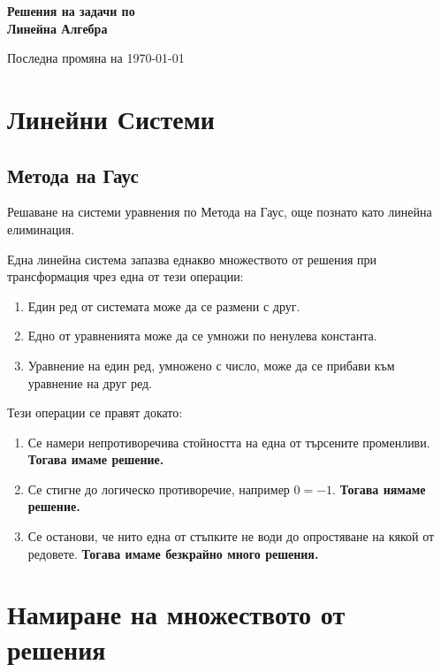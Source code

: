 \documentclass[12pt]{article}
\begin{document}
\begin{titlepage}
    \begin{center}
        \huge
        \textbf{Решения на задачи по \\ Линейна Алгебра}

        \large \vfill
        Последна промяна на \today
    \end{center}
\end{titlepage}
\newpage

\tableofcontents
\newpage

\section{Линейни Системи}

\subsection{Метода на Гаус}

\noindent Решаване на системи уравнения по Метода на Гаус, още познато като линейна елиминация.

\noindent Една линейна система запазва еднакво множеството от решения при трансформация чрез една от тези операции:
\begin{enumerate}
    \item Един ред от системата може да се размени с друг.
    \item Едно от уравненията може да се умножи по ненулева константа.
    \item Уравнение на един ред, умножено с число, може да се прибави към уравнение на друг ред.
\end{enumerate}

\noindent Тези операции се правят докато:
\begin{enumerate}
    \item Се намери непротиворечива стойността на една от търсените променливи. \textbf{Тогава имаме решение.}
    \item Се стигне до логическо противоречие, например $0=-1$. \textbf{Тогава нямаме решение.}
    \item Се останови, че нито една от стъпките не води до опростяване на кякой от редовете. \textbf{Тогава имаме безкрайно много решения.}
\end{enumerate}










\section{Намиране на множеството от решения}






\end{document}
